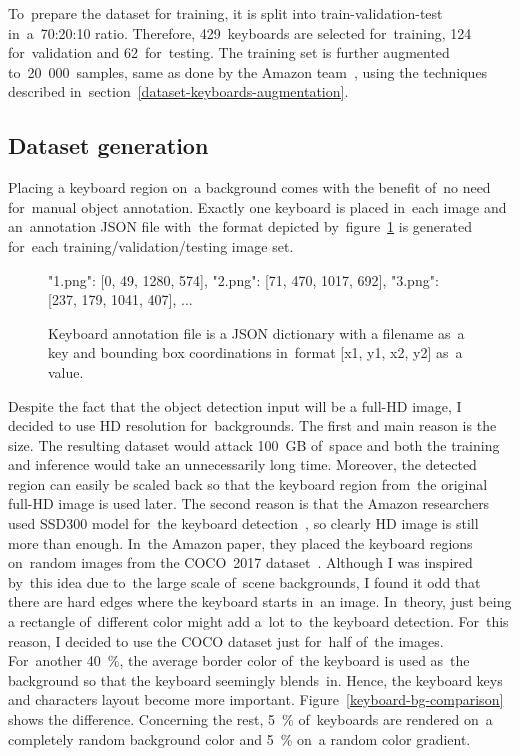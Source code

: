 To~prepare the dataset for training, it is split into train-validation-test in~a~70:20:10 ratio. Therefore, 429~keyboards are selected for~training, 124 for~validation and 62~for~testing. The training set is further augmented to~20~000~samples, same as done by the Amazon team~\cite{amazon-paper}, using the techniques described in~section~\ref{dataset-keyboards-augmentation}.

\subsection{Dataset generation}
\label{dataset-keyboards-generation}
Placing a keyboard region on~a background comes with the benefit of~no need for~\hbox{manual} object annotation. Exactly one keyboard is placed in~each image and an~annotation JSON file with~the format depicted by~figure~\ref{keyboard-annotation-json} is generated for~each training/validation/testing image set.

\vspace{-6pt}
\begin{figure}[hbt]
    \centering
    \begin{boxedverbatim}
"1.png": [0, 49, 1280, 574],
"2.png": [71, 470, 1017, 692],
"3.png": [237, 179, 1041, 407],
...\end{boxedverbatim}
    \caption{Keyboard annotation file is a JSON dictionary with a filename as~a key and bounding box coordinations in~format [x1, y1, x2, y2] as~a value.}
    \label{keyboard-annotation-json}
\end{figure}

Despite the fact that the object detection input will be a full-HD image, I decided to use HD resolution for~backgrounds. The first and main reason is the size. The resulting dataset would attack 100~GB of~space and both the training and inference would take an unnecessarily long time. Moreover, the detected region can easily be scaled back so that the keyboard region from~the original full-HD image is used later. The second reason is that the Amazon researchers used SSD300 model for~the keyboard detection~\cite{amazon-paper}, so clearly HD image is still more than enough. In~the Amazon paper, they placed the keyboard regions on~random images from the COCO~2017 dataset~\cite{amazon-paper}. Although I was inspired by~this idea due to~the large scale of~scene backgrounds, I found it odd that there are hard edges where the keyboard starts in~an image. In~theory, just being a rectangle of~different color might add a~lot to~the keyboard detection. For~this reason, I decided to use the COCO dataset just for~half of~the images. For~another 40~\%, the average border color of~the keyboard is used as~the background so that the keyboard seemingly blends~in. Hence, the keyboard keys and characters layout become more important. Figure~\ref{keyboard-bg-comparison} shows the difference. Concerning the rest, 5~\% of~keyboards are rendered on~a completely random background color and 5~\% on~a random color gradient.

